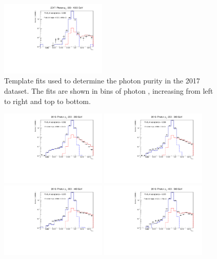 \begin{figure}[htbp]
    \includegraphics[width=0.45\textwidth]{fig/purity/fit_2017_pt600-1000.pdf}
    \caption{Template fits used to determine the photon purity in the 2017 dataset. The fits are shown in bins of photon \pt, increasing from left to right and top to bottom. }
    \label{fig:purity_fits_2017}
  \end{figure}
\begin{figure}[htbp]
    \centering
    \includegraphics[width=0.45\textwidth]{fig/purity/fit_2018_pt200-250.pdf}
    \includegraphics[width=0.45\textwidth]{fig/purity/fit_2018_pt250-300.pdf}
    \includegraphics[width=0.45\textwidth]{fig/purity/fit_2018_pt300-400.pdf}
    \includegraphics[width=0.45\textwidth]{fig/purity/fit_2018_pt400-500.pdf}

\end{figure}
